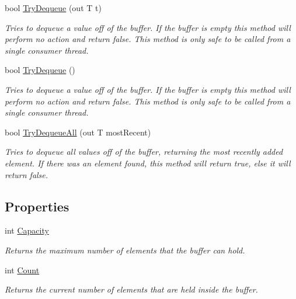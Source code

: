 \begin{DoxyCompactItemize}
bool \mbox{\hyperlink{class_leap_1_1_unity_1_1_produce_consume_buffer_a8974fa947fcc940620300c54d3de6f1b}{Try\+Dequeue}} (out T t)
\begin{DoxyCompactList}\small\item\em Tries to dequeue a value off of the buffer. If the buffer is empty this method will perform no action and return false. This method is only safe to be called from a single consumer thread. \end{DoxyCompactList}\item 
bool \mbox{\hyperlink{class_leap_1_1_unity_1_1_produce_consume_buffer_a0a756b193a73f2ab9dd21a89dce33b65}{Try\+Dequeue}} ()
\begin{DoxyCompactList}\small\item\em Tries to dequeue a value off of the buffer. If the buffer is empty this method will perform no action and return false. This method is only safe to be called from a single consumer thread. \end{DoxyCompactList}\item 
bool \mbox{\hyperlink{class_leap_1_1_unity_1_1_produce_consume_buffer_a72a0d4ce3f8ec48ed46fa80f5944f988}{Try\+Dequeue\+All}} (out T most\+Recent)
\begin{DoxyCompactList}\small\item\em Tries to dequeue all values off of the buffer, returning the most recently added element. If there was an element found, this method will return true, else it will return false. \end{DoxyCompactList}\end{DoxyCompactItemize}
\subsection*{Properties}
\begin{DoxyCompactItemize}
\item 
int \mbox{\hyperlink{class_leap_1_1_unity_1_1_produce_consume_buffer_a04753532a728b38e5cc0226c797fbef1}{Capacity}}
\begin{DoxyCompactList}\small\item\em Returns the maximum number of elements that the buffer can hold. \end{DoxyCompactList}\item 
int \mbox{\hyperlink{class_leap_1_1_unity_1_1_produce_consume_buffer_ab7a378bf347d928035288ae0e790b938}{Count}}
\begin{DoxyCompactList}\small\item\em Returns the current number of elements that are held inside the buffer. \end{DoxyCompactList}\end{DoxyCompactItemize}



